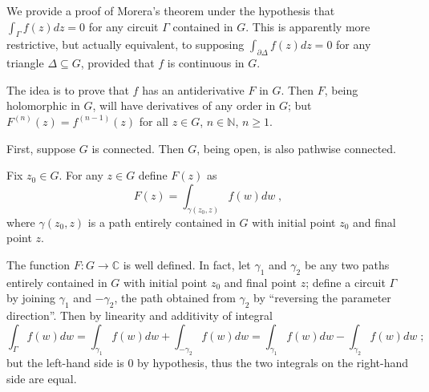 \documentclass[12pt]{article}
\begin{document}
We provide a proof of Morera's theorem
under the hypothesis that
\begin{math}
\int_\Gamma f(z)dz=0
\end{math}
for any circuit $\Gamma$ contained in $G$.
This is apparently more restrictive, but actually equivalent,
to supposing
\begin{math}
\int_{\partial\Delta} f(z)dz=0
\end{math}
for any triangle $\Delta\subseteq G$,
provided that $f$ is continuous in $G$.

The idea is to prove that $f$ has an antiderivative $F$ in $G$.
Then $F$, being holomorphic in $G$,
will have derivatives of any order in $G$;
but $F^{(n)}(z)=f^{(n-1)}(z)$ for all $z\in G$, $n\in\mathbb{N}$, $n\geq 1$.

First, suppose $G$ is connected.
Then $G$, being open, is also pathwise connected.

Fix $z_0\in G$.
For any $z\in G$ define $F(z)$ as
\begin{equation} \label{eq:antid}
F(z) = \int_{\gamma(z_0,z)}f(w)dw\;,
\end{equation}
where $\gamma(z_0,z)$ is a path entirely contained in $G$
with initial point $z_0$ and final point $z$.

The function $F:G\to\mathbb{C}$ is well defined.
In fact, let $\gamma_1$ and $\gamma_2$
be any two paths entirely contained in $G$
with initial point $z_0$ and final point $z$;
define a circuit $\Gamma$ by joining $\gamma_1$ and $-\gamma_2$,
the path obtained from $\gamma_2$ by
``reversing the parameter direction''.
Then by linearity and additivity of integral
\begin{equation} \label{eq:wd}
\int_\Gamma f(w)dw
=\int_{\gamma_1}f(w)dw+\int_{-\gamma_2}f(w)dw
=\int_{\gamma_1}f(w)dw-\int_{\gamma_2}f(w)dw\;;
\end{equation}
but the left-hand side is 0 by hypothesis,
thus the two integrals on the right-hand side are equal.
\end{document}
